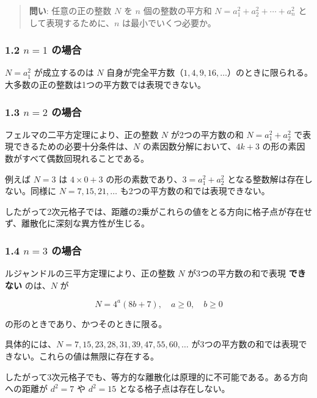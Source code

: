 \documentclass[a4paper,11pt]{ltjsarticle}
\begin{document}
\begin{quote}
\textbf{問い}: 任意の正の整数 \(N\) を \(n\) 個の整数の平方和
\(N = a_1^2 + a_2^2 + \cdots + a_n^2\) として表現するために、\(n\)
は最小でいくつ必要か。
\end{quote}

\subsubsection{\texorpdfstring{1.2 \(n = 1\)
の場合}{1.2 n = 1 の場合}}\label{n-1-ux306eux5834ux5408}

\(N = a_1^2\) が成立するのは \(N\)
自身が完全平方数（\(1, 4, 9, 16, \ldots\)）のときに限られる。大多数の正の整数は1つの平方数では表現できない。

\subsubsection{\texorpdfstring{1.3 \(n = 2\)
の場合}{1.3 n = 2 の場合}}\label{n-2-ux306eux5834ux5408}

フェルマの二平方定理により、正の整数 \(N\) が2つの平方数の和
\(N = a_1^2 + a_2^2\) で表現できるための必要十分条件は、\(N\)
の素因数分解において、\(4k + 3\)
の形の素因数がすべて偶数回現れることである。

例えば \(N = 3\) は \(4 \times 0 + 3\)
の形の素数であり、\(3 = a_1^2 + a_2^2\) となる整数解は存在しない。同様に
\(N = 7, 15, 21, \ldots\) も2つの平方数の和では表現できない。

したがって2次元格子では、距離の2乗がこれらの値をとる方向に格子点が存在せず、離散化に深刻な異方性が生じる。

\subsubsection{\texorpdfstring{1.4 \(n = 3\)
の場合}{1.4 n = 3 の場合}}\label{n-3-ux306eux5834ux5408}

ルジャンドルの三平方定理により、正の整数 \(N\) が3つの平方数の和で表現
\textbf{できない} のは、\(N\) が

\[N = 4^a(8b + 7), \quad a \geq 0, \quad b \geq 0\]

の形のときであり、かつそのときに限る。

具体的には、\(N = 7, 15, 23, 28, 31, 39, 47, 55, 60, \ldots\)
が3つの平方数の和では表現できない。これらの値は無限に存在する。

したがって3次元格子でも、等方的な離散化は原理的に不可能である。ある方向への距離が
\(d^2 = 7\) や \(d^2 = 15\) となる格子点は存在しない。
\end{document}
